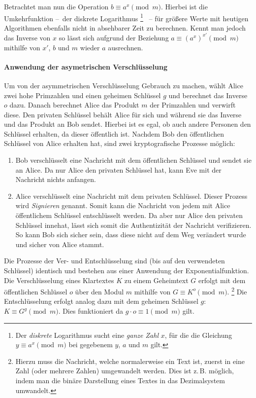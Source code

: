 Betrachtet man nun die Operation $b \equiv a^x \pmod{m}$.
Hierbei ist die Umkehrfunktion --~der diskrete Logarithmus%
\footnote{Der \emph{diskrete} Logarithmus sucht eine \emph{ganze Zahl} $x$, für die die Gleichung $y \equiv a^x \pmod{m}$ bei gegebenem $y$, $a$ und $m$ gilt.}
~-- für größere Werte mit heutigen Algorithmen ebenfalls nicht in absehbarer Zeit zu berechnen.
Kennt man jedoch das Inverse von $x$ so lässt sich aufgrund der Beziehung $a \equiv (a^x)^{x'} \pmod{m}$ mithilfe von $x'$, $b$ und $m$ wieder $a$ ausrechnen.

\paragraph{Anwendung der asymetrischen Verschlüsselung}

Um von der asymmetrischen Verschlüsselung Gebrauch zu machen, wählt Alice zwei hohe Primzahlen und einen geheimen Schlüssel $g$ und berechnet das Inverse $o$ dazu.
Danach berechnet Alice das Produkt $m$ der Primzahlen und verwirft diese.
Den privaten Schlüssel behält Alice für sich und während sie das Inverse und das Produkt an Bob sendet.
Hierbei ist es egal, ob auch andere Personen den Schlüssel erhalten, da dieser öffentlich ist.
Nachdem Bob den öffentlichen Schlüssel von Alice erhalten hat, sind zwei kryptografische Prozesse möglich:
\begin{enumerate}
    \item Bob verschlüsselt eine Nachricht mit dem öffentlichen Schlüssel und sendet sie an Alice.
    Da nur Alice den privaten Schlüssel hat, kann Eve mit der Nachricht nichts anfangen.
    \item Alice verschlüsselt eine Nachricht mit dem privaten Schlüssel.
    Dieser Prozess wird \emph{Signieren} genannt.
    Somit kann die Nachricht von jedem mit Alice öffentlichem Schlüssel entschlüsselt werden.
    Da aber nur Alice den privaten Schlüssel innehat, lässt sich somit die Authentizität der Nachricht verifizieren.
    So kann Bob sich sicher sein, dass diese nicht auf dem Weg verändert wurde und sicher von Alice stammt.
\end{enumerate}

Die Prozesse der Ver- und Entschlüsselung sind (bis auf den verwendeten Schlüssel) identisch und bestehen aus einer Anwendung der Exponentialfunktion.
Die Verschlüsselung eines Klartextes $K$ zu einem Geheimtext $G$ erfolgt mit dem öffentlichen Schlüssel $o$ über den Modul $m$ mithilfe von $G \equiv K^o \pmod{m}$.%
\footnote{Hierzu muss die Nachricht, welche normalerweise ein Text ist, zuerst in eine Zahl (oder mehrere Zahlen) umgewandelt werden.
Dies ist z.\,B. möglich, indem man die binäre Darstellung eines Textes in das Dezimalsystem umwandelt.}
Die Entschlüsselung erfolgt analog dazu mit dem geheimen Schlüssel $g$: $K \equiv G^g \pmod{m}$.
Dies funktioniert da $g \cdot o \equiv 1 \pmod{m}$ gilt.

